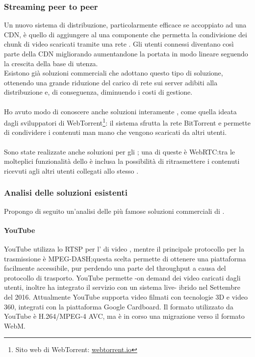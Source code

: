 	\subsubsection{Streaming peer to peer}
	Un nuovo sistema di distribuzione, particolarmente efficace se accoppiato ad una \gls{CDN}, è quello di aggiungere al  una componente che permetta la condivisione dei chunk di video scaricati tramite una rete . Gli utenti connessi diventano così parte della \gls{CDN} migliorando aumentandone la portata in modo lineare seguendo la crescita della base di utenza.
	\\
	Esistono già soluzioni commerciali che adottano questo tipo di soluzione, ottenendo una grande riduzione del carico di rete sui server adibiti alla distribuzione e, di conseguenza, diminuendo i costi di gestione.
	\paragraph*{}
	Ho avuto modo di conoscere anche soluzioni interamente , come quella ideata dagli sviluppatori di WebTorrent\footnote{Sito web di WebTorrent: \href{https://webtorrent.io/}{webtorrent.io}}: il sistema sfrutta la rete BitTorrent e permette di condividere i contenuti man mano che vengono scaricati da altri utenti.
	\paragraph*{}
	Sono state realizzate anche soluzioni  per gli  ; una di queste è WebRTC:\@ tra le molteplici funzionalità dello  è inclusa la possibilità di ritrasmettere i contenuti ricevuti agli altri utenti collegati allo stesso .

	\subsubsection{Analisi delle soluzioni esistenti}
	Propongo di seguito un'analisi delle più famose soluzioni commerciali di .
		\paragraph{YouTube}
		YouTube utilizza lo  \gls{RTSP} per l' di  video , mentre il principale protocollo per la trasmissione è MPEG-DASH;\@ questa scelta permette di ottenere una piattaforma facilmente accessibile, pur perdendo una parte del throughput a causa del protocollo di trasporto. YouTube permette -on demand dei video caricati dagli utenti, inoltre ha integrato il servizio con un sistema live- ibrido nel Settembre del 2016. Attualmente YouTube supporta video filmati con tecnologie 3D e video 360\textdegree, integrati con la piattaforma Google Cardboard. Il formato  utilizzato da YouTube è H.264/MPEG-4 AVC, ma è in corso una migrazione verso il formato WebM.
